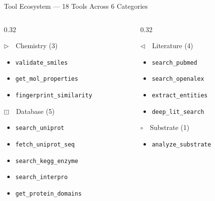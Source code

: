 \documentclass[aspectratio=169, 11pt]{beamer}
\newcommand{\faMortarPestle}{\ensuremath{\triangleright}}
\newcommand{\faDatabase}{\ensuremath{\boxdot}}
\newcommand{\faBook}{\ensuremath{\triangleleft}}
\newcommand{\faFlask}{\ensuremath{\circ}}
\begin{document}
\begin{frame}{Tool Ecosystem --- 18 Tools Across 6 Categories}
\vspace{-4pt}

\begin{columns}[T]
\begin{column}{0.32\textwidth}

\begin{block}{\faMortarPestle\ \ Chemistry (3)}
\begin{itemize}\scriptsize
\setlength\itemsep{0pt}
\item \texttt{validate\_smiles}
\item \texttt{get\_mol\_properties}
\item \texttt{fingerprint\_similarity}
\end{itemize}
\end{block}

\begin{block}{\faDatabase\ \ Database (5)}
\begin{itemize}\scriptsize
\setlength\itemsep{0pt}
\item \texttt{search\_uniprot}
\item \texttt{fetch\_uniprot\_seq}
\item \texttt{search\_kegg\_enzyme}
\item \texttt{search\_interpro}
\item \texttt{get\_protein\_domains}
\end{itemize}
\end{block}

\end{column}
\begin{column}{0.32\textwidth}

\begin{block}{\faBook\ \ Literature (4)}
\begin{itemize}\scriptsize
\setlength\itemsep{0pt}
\item \texttt{search\_pubmed}
\item \texttt{search\_openalex}
\item \texttt{extract\_entities}
\item \texttt{deep\_lit\_search}
\end{itemize}
\end{block}

\begin{block}{\faFlask\ \ Substrate (1)}
\begin{itemize}\scriptsize
\setlength\itemsep{0pt}
\item \texttt{analyze\_substrate}
\end{itemize}
\end{block}


\end{column}
\end{columns}
\end{frame}
\end{document}
